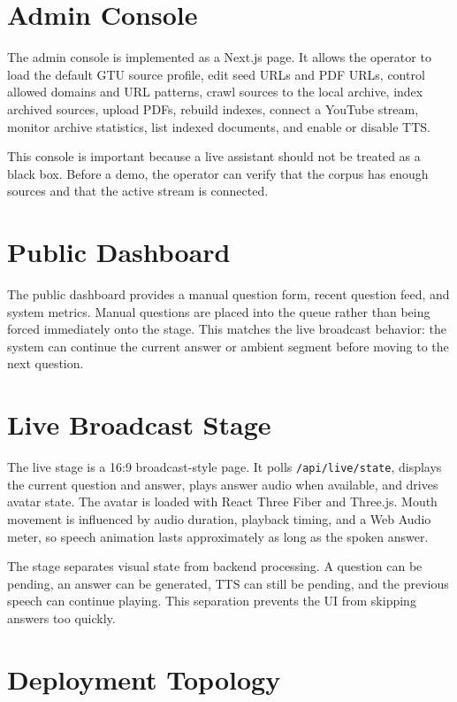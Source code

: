 \section{Admin Console}

The admin console is implemented as a Next.js page. It allows the operator to load the default GTU source profile, edit seed URLs and PDF URLs, control allowed domains and URL patterns, crawl sources to the local archive, index archived sources, upload PDFs, rebuild indexes, connect a YouTube stream, monitor archive statistics, list indexed documents, and enable or disable TTS.

This console is important because a live assistant should not be treated as a black box. Before a demo, the operator can verify that the corpus has enough sources and that the active stream is connected.

\section{Public Dashboard}

The public dashboard provides a manual question form, recent question feed, and system metrics. Manual questions are placed into the queue rather than being forced immediately onto the stage. This matches the live broadcast behavior: the system can continue the current answer or ambient segment before moving to the next question.

\section{Live Broadcast Stage}

The live stage is a 16:9 broadcast-style page. It polls \texttt{/api/live/state}, displays the current question and answer, plays answer audio when available, and drives avatar state. The avatar is loaded with React Three Fiber and Three.js. Mouth movement is influenced by audio duration, playback timing, and a Web Audio meter, so speech animation lasts approximately as long as the spoken answer.

The stage separates visual state from backend processing. A question can be pending, an answer can be generated, TTS can still be pending, and the previous speech can continue playing. This separation prevents the UI from skipping answers too quickly.

\section{Deployment Topology}

